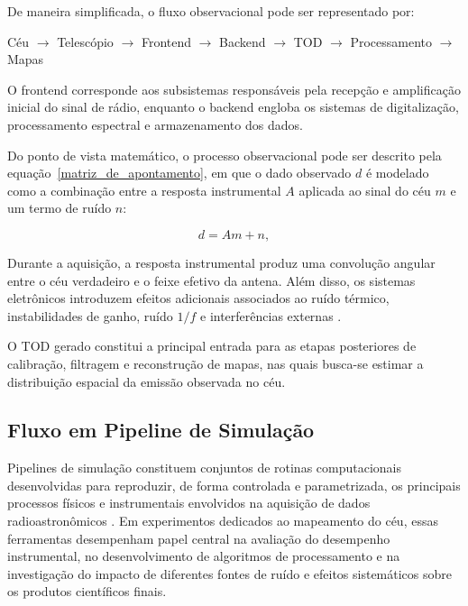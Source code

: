 De maneira simplificada, o fluxo observacional pode ser representado por:

\begin{center}
Céu \(\rightarrow\) Telescópio \(\rightarrow\) Frontend \(\rightarrow\) Backend \(\rightarrow\) TOD \(\rightarrow\) Processamento \(\rightarrow\) Mapas
\end{center}

O frontend corresponde aos subsistemas responsáveis pela recepção e amplificação inicial do sinal de rádio, enquanto o backend engloba os sistemas de digitalização, processamento espectral e armazenamento dos dados.

Do ponto de vista matemático, o processo observacional pode ser descrito pela equação~\eqref{matriz_de_apontamento}, em que o dado observado \(d\) é modelado como a combinação entre a resposta instrumental \(A\) aplicada ao sinal do céu \(m\) e um termo de ruído \(n\):

\begin{equation}
d = A m + n,
\label{eq:modelo_obs}
\end{equation}

Durante a aquisição, a resposta instrumental produz uma convolução angular entre o céu verdadeiro e o feixe efetivo da antena. Além disso, os sistemas eletrônicos introduzem efeitos adicionais associados ao ruído térmico, instabilidades de ganho, ruído \(1/f\) e interferências externas \cite{ramalho2023impactos}.

O TOD gerado constitui a principal entrada para as etapas posteriores de calibração, filtragem e reconstrução de mapas, nas quais busca-se estimar a distribuição espacial da emissão observada no céu.

\subsection{Fluxo em Pipeline de Simulação}

Pipelines de simulação constituem conjuntos de rotinas computacionais desenvolvidas para reproduzir, de forma controlada e parametrizada, os principais processos físicos e instrumentais envolvidos na aquisição de dados radioastronômicos \cite{mericia2019hi}. Em experimentos dedicados ao mapeamento do céu, essas ferramentas desempenham papel central na avaliação do desempenho instrumental, no desenvolvimento de algoritmos de processamento e na investigação do impacto de diferentes fontes de ruído e efeitos sistemáticos sobre os produtos científicos finais.

